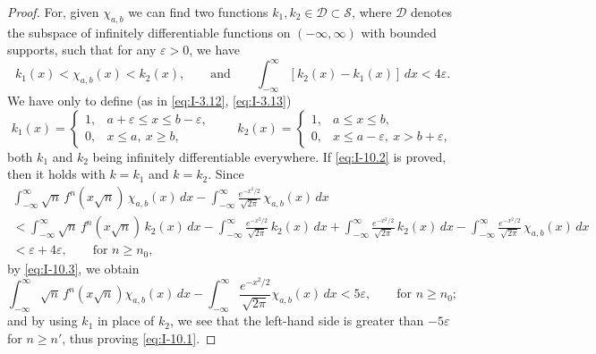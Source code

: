 \begin{proof}
For, given $\chi_{a,b}$ we can find two functions $k_1,k_2\in\mathcal D\subset\mathcal S$, where $\mathcal D$ denotes the subspace of infinitely differentiable functions on $(-\infty,\infty)$ with bounded supports, such that for any $\varepsilon>0$, we have
\begin{equation}\label{eq:I-10.3}\tag{10.3}
k_1(x)<\chi_{a,b}(x)<k_2(x),\qquad\text{and}\qquad
\int_{-\infty}^{\infty}[k_2(x)-k_1(x)]\,dx<4\varepsilon.
\end{equation}
We have only to define (as in \eqref{eq:I-3.12}, \eqref{eq:I-3.13})
\begin{equation}\tag{10.4}\label{eq:I-10.4}
k_1(x)=
\begin{cases}
1,&a+\varepsilon\le x\le b-\varepsilon,\\
0,&x\le a,\ x\ge b,
\end{cases}
\qquad
k_2(x)=
\begin{cases}
1,&a\le x\le b,\\
0,&x\le a-\varepsilon,\ x>b+\varepsilon,
\end{cases}
\end{equation}
both $k_1$ and $k_2$ being infinitely differentiable everywhere. If \eqref{eq:I-10.2} is proved, then it holds with $k=k_1$ and $k=k_2$. Since
\begin{multline*}
\int_{-\infty}^{\infty}\sqrt n\,f^n(x\sqrt n)\,\chi_{a,b}(x)\,dx
-\int_{-\infty}^{\infty}\frac{e^{-x^{2}/2}}{\sqrt{2\pi}}\,\chi_{a,b}(x)\,dx\\
<\int_{-\infty}^{\infty}\sqrt n\,f^n(x\sqrt n)\,k_2(x)\,dx
-\int_{-\infty}^{\infty}\frac{e^{-x^{2}/2}}{\sqrt{2\pi}}\,k_2(x)\,dx
+\int_{-\infty}^{\infty}\frac{e^{-x^{2}/2}}{\sqrt{2\pi}}\,k_2(x)\,dx
-\int_{-\infty}^{\infty}\frac{e^{-x^{2}/2}}{\sqrt{2\pi}}\,\chi_{a,b}(x)\,dx\\
<\varepsilon+4\varepsilon,\qquad\text{for }n\ge n_0,
\end{multline*}
by \eqref{eq:I-10.3}, we obtain
\begin{equation*}
\int_{-\infty}^{\infty}\sqrt n\,f^n(x\sqrt n)\chi_{a,b}(x)\,dx
-\int_{-\infty}^{\infty}\frac{e^{-x^{2}/2}}{\sqrt{2\pi}}\chi_{a,b}(x)\,dx<5\varepsilon,\qquad\text{for }n\ge n_0;
\end{equation*}
and by using $k_1$ in place of $k_2$, we see that the left-hand side is greater than $-5\varepsilon$ for $n\ge n'$, thus proving \eqref{eq:I-10.1}.


\end{proof}
